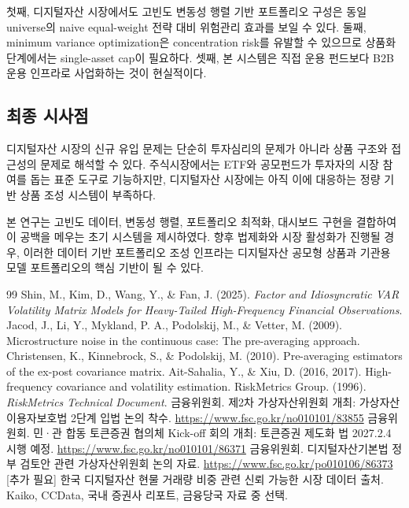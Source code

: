 \documentclass[12pt,a4paper]{article}
\begin{document}
첫째, 디지털자산 시장에서도 고빈도 변동성 행렬 기반 포트폴리오 구성은 동일 universe의 naive equal-weight 전략 대비 위험관리 효과를 보일 수 있다. 둘째, minimum variance optimization은 concentration risk를 유발할 수 있으므로 상품화 단계에서는 single-asset cap이 필요하다. 셋째, 본 시스템은 직접 운용 펀드보다 B2B 운용 인프라로 사업화하는 것이 현실적이다.

\subsection{최종 시사점}

디지털자산 시장의 신규 유입 문제는 단순히 투자심리의 문제가 아니라 상품 구조와 접근성의 문제로 해석할 수 있다. 주식시장에서는 ETF와 공모펀드가 투자자의 시장 참여를 돕는 표준 도구로 기능하지만, 디지털자산 시장에는 아직 이에 대응하는 정량 기반 상품 조성 시스템이 부족하다.

본 연구는 고빈도 데이터, 변동성 행렬, 포트폴리오 최적화, 대시보드 구현을 결합하여 이 공백을 메우는 초기 시스템을 제시하였다. 향후 법제화와 시장 활성화가 진행될 경우, 이러한 데이터 기반 포트폴리오 조성 인프라는 디지털자산 공모형 상품과 기관용 모델 포트폴리오의 핵심 기반이 될 수 있다.


\begin{thebibliography}{99}
 Shin, M., Kim, D., Wang, Y., \& Fan, J. (2025). \emph{Factor and Idiosyncratic VAR Volatility Matrix Models for Heavy-Tailed High-Frequency Financial Observations}.
 Jacod, J., Li, Y., Mykland, P. A., Podolskij, M., \& Vetter, M. (2009). Microstructure noise in the continuous case: The pre-averaging approach.
 Christensen, K., Kinnebrock, S., \& Podolskij, M. (2010). Pre-averaging estimators of the ex-post covariance matrix.
 Ait-Sahalia, Y., \& Xiu, D. (2016, 2017). High-frequency covariance and volatility estimation.
 RiskMetrics Group. (1996). \emph{RiskMetrics Technical Document}.
 금융위원회. 제2차 가상자산위원회 개최: 가상자산이용자보호법 2단계 입법 논의 착수. \url{https://www.fsc.go.kr/no010101/83855}
 금융위원회. 민·관 합동 토큰증권 협의체 Kick-off 회의 개최: 토큰증권 제도화 법 2027.2.4 시행 예정. \url{https://www.fsc.go.kr/no010101/86371}
 금융위원회. 디지털자산기본법 정부 검토안 관련 가상자산위원회 논의 자료. \url{https://www.fsc.go.kr/po010106/86373}
 [추가 필요] 한국 디지털자산 현물 거래량 비중 관련 신뢰 가능한 시장 데이터 출처. Kaiko, CCData, 국내 증권사 리포트, 금융당국 자료 중 선택.
\end{thebibliography}
\appendix
\end{document}

